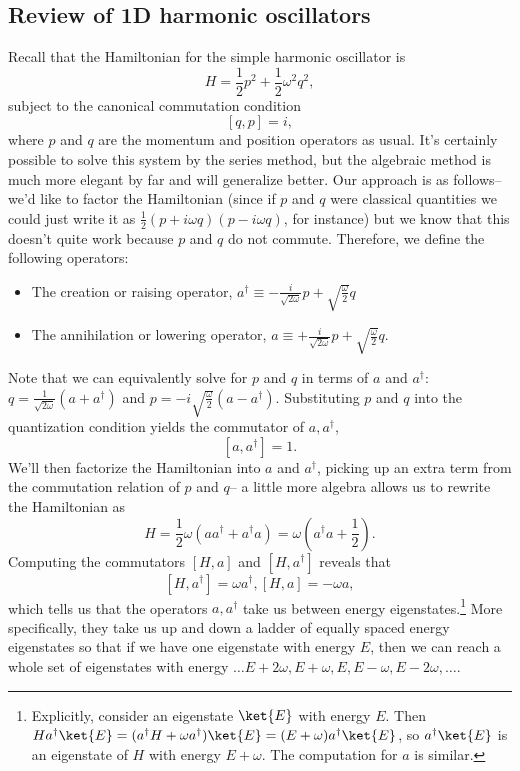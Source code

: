 \subsection*{Review of 1D harmonic oscillators} Recall that the Hamiltonian for the simple harmonic oscillator is
$$H=\frac{1}{2} p^2 +\frac{1}{2} \omega^2 q^2,$$
subject to the canonical commutation condition $$[q,p]=i,$$ 
where $p$ and $q$ are the momentum and position operators as usual. It's certainly possible to solve this system by the series method, but the algebraic method is much more elegant by far and will generalize better. Our approach is as follows-- we'd like to factor the Hamiltonian (since if $p$ and $q$ were classical quantities we could just write it as $\frac{1}{2}(p+i\omega q)(p-i\omega q)$, for instance) but we know that this doesn't quite work because $p$ and $q$ do not commute. Therefore, we define the following operators:
\begin{itemize}
\item The creation or raising operator, $a^\dagger \equiv -\frac{i}{\sqrt{2\omega}} p +\sqrt{\frac{\omega}{2}}q$
\item The annihilation or lowering operator, $a \equiv +\frac{i}{\sqrt{2\omega}} p +\sqrt{\frac{\omega}{2}}q$.
\end{itemize}
Note that we can equivalently solve for $p$ and $q$ in terms of $a$ and $a^\dagger$: $q=\frac{1}{\sqrt{2\omega}}(a+a^\dagger)$ and $p=-i \sqrt{\frac{\omega}{2}}(a-a^\dagger)$. Substituting $p$ and $q$ into the quantization condition yields the commutator of $a,a^\dagger$,
$$[a,a^\dagger]=1.$$
We'll then factorize the Hamiltonian into $a$ and $a^\dagger$, picking up an extra term from the commutation relation of $p$ and $q$-- a little more algebra allows us to rewrite the Hamiltonian as
$$H=\frac{1}{2}\omega (a a^\dagger+ a^\dagger a)=\omega \left(a^\dagger a +\frac{1}{2}\right).$$
Computing the commutators $[H,a]$ and $[H,a^\dagger]$ reveals that
$$[H,a^\dagger]=\omega a^\dagger, [H,a]=-\omega a,$$
which tells us that the operators $a,a^\dagger$ take us between energy eigenstates.\footnote{Explicitly, consider an eigenstate $\ket{E}$ with energy $E$. Then $H a^\dagger \ket{E}=(a^\dagger H +\omega a^\dagger)\ket{E} =(E+\omega)a^\dagger \ket{E}$, so $a^\dagger \ket{E}$ is an eigenstate of $H$ with energy $E+\omega.$ The computation for $a$ is similar.} More specifically, they take us up and down a ladder of equally spaced energy eigenstates so that if we have one eigenstate with energy $E$, then we can reach a whole set of eigenstates with energy $\ldots E+2\omega, E+\omega, E, E-\omega, E-2\omega, \ldots$.

